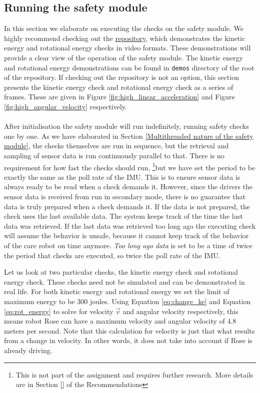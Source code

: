 \documentclass[12pt]{scrreprt}
\begin{document}
\subsection{Running the safety module}
\label{Running the safety module}
In this section we elaborate on executing the checks on the safety module. We highly recommend checking out the \href{https://github.com/Yousousen/safety-module-for-care-robot-rose}{repository}, which demonstrates the kinetic energy and rotational energy checks in video formats. These demonstrations will provide a clear view of the operation of the safety module. The kinetic energy and rotational energy demonstrations can be found in \texttt{demos} directory of the root of the repository. If checking out the repository is not an option, this section presents the kinetic energy check and rotational energy check as a series of frames. These are given in Figure \ref{fig:high_linear_acceleration} and Figure \ref{fig:high_angular_velocity} respectively.
\\\\
After initialisation the safety module will run indefinitely, running safety checks one by one. As we have elaborated in Section \ref{Multithreaded nature of the safety module}, the checks themselves are run in sequence, but the retrieval and sampling of sensor data is run continuously parallel to that. There is no requirement for how fast the checks should run, \footnote{This is not part of the assignment and requires further research. More details are in Section \ref{} of the Recommendations}but we have set the period to be exactly the same as the poll rate of the IMU. This is to ensure sensor data is always ready to be read when a check demands it. However, since the drivers the sensor data is received from run in secondary mode, there is no guarantee that data is truly prepared when a check demands it. If the data is not prepared, the check uses the last available data. The system keeps track of the time the last data was retrieved. If the last data was retrieved too long ago the executing check will assume the behavior is unsafe, because it cannot keep track of the behavior of the care robot on time anymore. \textit{Too long ago data} is set to be a time of twice the period that checks are executed, so twice the poll rate of the IMU.
\par
Let us look at two particular checks, the kinetic energy check and rotational energy check. These checks need not be simulated and can be demonstrated in real life. For both kinetic energy and rotational energy we set the limit of maximum energy to be $300$ joules. Using Equation \ref{eq:change_ke} and Equation \ref{eq:rot_energy} to solve for velocity $\vec{v}$ and angular velocity respectively, this means robot Rose can have a maximum velocity and angular velocity of $4.8$ meters per second. Note that this calculation for velocity is just that what results from a change in velocity. In other words, it does not take into account if Rose is already driving.
\end{document}
